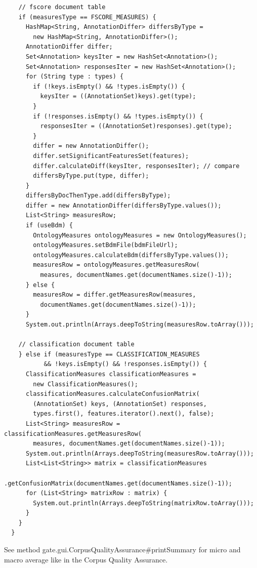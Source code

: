 \begin{lstlisting}
    // fscore document table
    if (measuresType == FSCORE_MEASURES) {
      HashMap<String, AnnotationDiffer> differsByType =
        new HashMap<String, AnnotationDiffer>();
      AnnotationDiffer differ;
      Set<Annotation> keysIter = new HashSet<Annotation>();
      Set<Annotation> responsesIter = new HashSet<Annotation>();
      for (String type : types) {
        if (!keys.isEmpty() && !types.isEmpty()) {
          keysIter = ((AnnotationSet)keys).get(type);
        }
        if (!responses.isEmpty() && !types.isEmpty()) {
          responsesIter = ((AnnotationSet)responses).get(type);
        }
        differ = new AnnotationDiffer();
        differ.setSignificantFeaturesSet(features);
        differ.calculateDiff(keysIter, responsesIter); // compare
        differsByType.put(type, differ);
      }
      differsByDocThenType.add(differsByType);
      differ = new AnnotationDiffer(differsByType.values());
      List<String> measuresRow;
      if (useBdm) {
        OntologyMeasures ontologyMeasures = new OntologyMeasures();
        ontologyMeasures.setBdmFile(bdmFileUrl);
        ontologyMeasures.calculateBdm(differsByType.values());
        measuresRow = ontologyMeasures.getMeasuresRow(
          measures, documentNames.get(documentNames.size()-1));
      } else {
        measuresRow = differ.getMeasuresRow(measures,
          documentNames.get(documentNames.size()-1));
      }
      System.out.println(Arrays.deepToString(measuresRow.toArray()));

    // classification document table
    } else if (measuresType == CLASSIFICATION_MEASURES
           && !keys.isEmpty() && !responses.isEmpty()) {
      ClassificationMeasures classificationMeasures =
        new ClassificationMeasures();
      classificationMeasures.calculateConfusionMatrix(
        (AnnotationSet) keys, (AnnotationSet) responses,
        types.first(), features.iterator().next(), false);
      List<String> measuresRow = classificationMeasures.getMeasuresRow(
        measures, documentNames.get(documentNames.size()-1));
      System.out.println(Arrays.deepToString(measuresRow.toArray()));
      List<List<String>> matrix = classificationMeasures
        .getConfusionMatrix(documentNames.get(documentNames.size()-1));
      for (List<String> matrixRow : matrix) {
        System.out.println(Arrays.deepToString(matrixRow.toArray()));
      }
    }
  }
\end{lstlisting}

See method
{gate.gui.CorpusQualityAssurance\#printSummary} for micro and macro average
like in the Corpus Quality Assurance.

